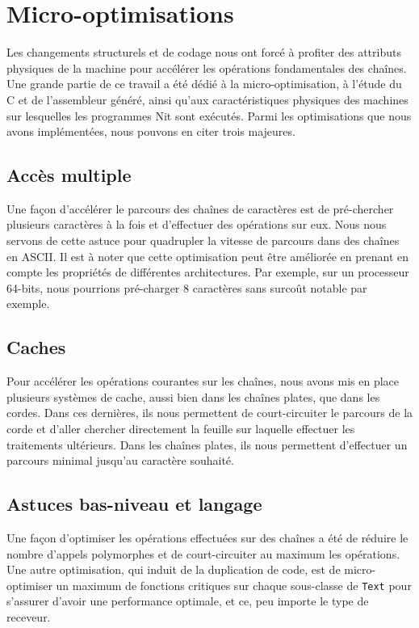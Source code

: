 \section{Micro-optimisations}

Les changements structurels et de codage nous ont forcé à profiter des attributs physiques de la machine pour
accélérer les opérations fondamentales des chaînes.
Une grande partie de ce travail a été dédié à la micro-optimisation, à l'étude du C et de l'assembleur généré,
ainsi qu'aux caractéristiques physiques des machines sur lesquelles les programmes Nit sont exécutés.
Parmi les optimisations que nous avons implémentées, nous pouvons en citer trois majeures.

\subsection{Accès multiple}

Une façon d'accélérer le parcours des chaînes de caractères est de pré-chercher plusieurs
caractères à la fois et d'effectuer des opérations sur eux. Nous nous servons de cette astuce pour quadrupler la vitesse
de parcours dans des chaînes en ASCII. Il est à noter que cette optimisation peut être améliorée en prenant en compte les
propriétés de différentes architectures. Par exemple, sur un processeur 64-bits, nous pourrions pré-charger 8 caractères
sans surcoût notable par exemple.

\subsection{Caches}

Pour accélérer les opérations courantes sur les chaînes, nous avons mis en place plusieurs systèmes
de cache, aussi bien dans les chaînes plates, que dans les cordes. Dans ces dernières, ils nous permettent de court-circuiter
le parcours de la corde et d'aller chercher directement la feuille sur laquelle effectuer les traitements ultérieurs.
Dans les chaînes plates, ils nous permettent d'effectuer un parcours minimal jusqu'au caractère souhaité.

\subsection{Astuces bas-niveau et langage}

Une façon d'optimiser les opérations effectuées sur des chaînes
a été de réduire le nombre d'appels polymorphes et de court-circuiter au maximum les opérations.
Une autre optimisation, qui induit de la duplication de code, est de micro-optimiser
un maximum de fonctions critiques sur chaque sous-classe de \texttt{Text} pour s'assurer d'avoir
une performance optimale, et ce, peu importe le type de receveur.


